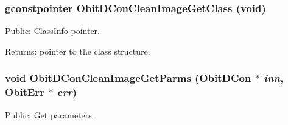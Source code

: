 \subsubsection{\setlength{\rightskip}{0pt plus 5cm}gconstpointer Obit\-DCon\-Clean\-Image\-Get\-Class (void)}\label{ObitDConCleanImage_8h_a6}


Public: Class\-Info pointer. 

\begin{Desc}
\item[Returns:]pointer to the class structure. \end{Desc}
\subsubsection{\setlength{\rightskip}{0pt plus 5cm}void Obit\-DCon\-Clean\-Image\-Get\-Parms ({\bf Obit\-DCon} $\ast$ {\em inn}, {\bf Obit\-Err} $\ast$ {\em err})}\label{ObitDConCleanImage_8h_a10}


Public: Get parameters. 

